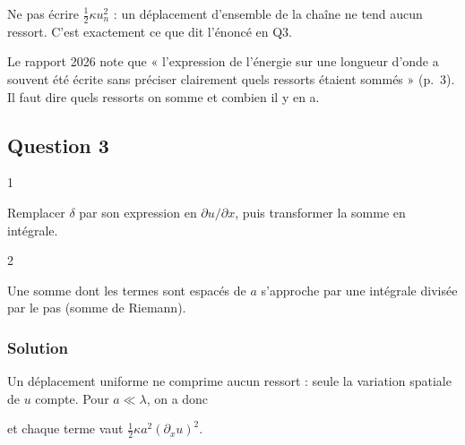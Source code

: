 \documentclass[11pt,a4paper]{article}
\newcommand{\equationajustee}[1]{%
  \sbox{\boiteequation}{$\displaystyle #1$}%
  \ifdim\wd\boiteequation>\linewidth
    \[\resizebox{\linewidth}{!}{\usebox{\boiteequation}}\]%
  \else
    \[#1\]%
  \fi}
\begin{document}
\equationajustee{\boxed{E_p^{\lambda}=\sum_{n=1}^{\lambda/a}\tfrac12\,\kappa\,\big[u((n+1)a,t)-u(na,t)\big]^2}}

\begin{piege}

Ne pas écrire \(\frac12\kappa u_n^2\) : un déplacement d'ensemble de la chaîne ne tend aucun ressort. C'est exactement ce que dit l'énoncé en Q3.

\end{piege}

\begin{jury}

Le rapport 2026 note que « l'expression de l'énergie sur une longueur d'onde a souvent été écrite sans préciser clairement quels ressorts étaient sommés » (p.~3). Il faut dire quels ressorts on somme et combien il y en a.

\end{jury}

\hypertarget{question-3}{%
\subsection{Question 3}\label{question-3}}

\begin{indication}{1}

Remplacer \(\delta\) par son expression en \(\partial u/\partial x\), puis transformer la somme en intégrale.

\end{indication}

\begin{indication}{2}

Une somme dont les termes sont espacés de \(a\) s'approche par une intégrale divisée par le pas (somme de Riemann).

\end{indication}

\hypertarget{solution-2}{%
\subsubsection{Solution}\label{solution-2}}

Un déplacement uniforme ne comprime aucun ressort : seule la variation spatiale de \(u\) compte. Pour \(a\ll\lambda\), on a donc

\equationajustee{\delta_n\simeq a\,\frac{\partial u}{\partial x}(x_n,t),}

et chaque terme vaut \(\frac12\kappa a^2(\partial_xu)^2\).
\end{document}
